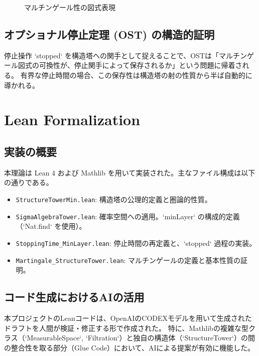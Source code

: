 \documentclass[11pt, a4paper]{article}
\begin{document}
\begin{figure}[htbp]
  \centering
  \caption{マルチンゲール性の図式表現}
\end{figure}

\subsection{オプショナル停止定理 (OST) の構造的証明}
停止操作 `stopped` を構造塔への関手として捉えることで、OSTは「マルチンゲール図式の可換性が、停止関手によって保存されるか」という問題に帰着される。
有界な停止時間の場合、この保存性は構造塔の射の性質から半ば自動的に導かれる。

\section{Lean Formalization}

\subsection{実装の概要}
本理論は Lean 4 および Mathlib を用いて実装された。主なファイル構成は以下の通りである。

\begin{itemize}
    \item \texttt{StructureTowerMin.lean}: 構造塔の公理的定義と圏論的性質。
    \item \texttt{SigmaAlgebraTower.lean}: 確率空間への適用。`minLayer` の構成的定義（`Nat.find` を使用）。
    \item \texttt{StoppingTime\_MinLayer.lean}: 停止時間の再定義と、`stopped` 過程の実装。
    \item \texttt{Martingale\_StructureTower.lean}: マルチンゲールの定義と基本性質の証明。
\end{itemize}

\subsection{コード生成におけるAIの活用}
本プロジェクトのLeanコードは、OpenAIのCODEXモデルを用いて生成されたドラフトを人間が検証・修正する形で作成された。
特に、Mathlibの複雑な型クラス（`MeasurableSpace`, `Filtration`）と独自の構造体（`StructureTower`）の間の整合性を取る部分（Glue Code）において、AIによる提案が有効に機能した。
\end{document}
